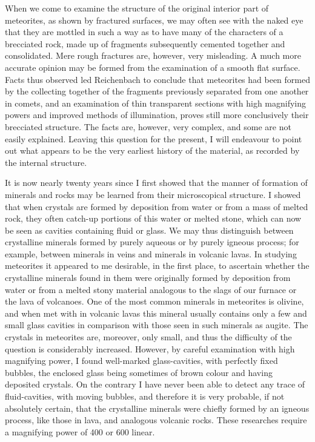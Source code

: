 \documentclass[a4paper, 12pt, oneside]{article}
\begin{document}
When we come to examine the structure of the original interior part of meteorites, as shown by fractured surfaces, we may often see with the naked eye that they are mottled in such a way as to have many of the characters of a brecciated rock, made up of fragments subsequently cemented together and consolidated. Mere rough fractures are, however, very misleading. A much more accurate opinion may be formed from the examination of a smooth flat surface. Facts thus observed led Reichenbach to conclude that meteorites had been formed by the collecting together of the fragments previously separated from one another in comets, and an examination of thin transparent sections with high magnifying powers and improved methods of illumination, proves still more conclusively their brecciated structure. The facts are, however, very complex, and some are not easily explained. Leaving this question for the present, I will endeavour to point out what appears to be the very earliest history of the material, as recorded by the internal structure.

It is now nearly twenty years since I first showed that the manner of formation of minerals and rocks may be learned from their microscopical structure. I showed that when crystals are formed by deposition from water or from a mass of melted rock, they often catch-up portions of this water or melted stone, which can now be seen as cavities containing fluid or glass. We may thus distinguish between crystalline minerals formed by purely aqueous or by purely igneous process; for example, between minerals in veins and minerals in volcanic lavas. In studying meteorites it appeared to me desirable, in the first place, to ascertain whether the crystalline minerals found in them were originally formed by deposition from water or from a melted stony material analogous to the slags of our furnace or the lava of volcanoes. One of the most common minerals in meteorites is olivine, and when met with in volcanic lavas this mineral usually contains only a few and small glass cavities in comparison with those seen in such minerals as augite. The crystals in meteorites are, moreover, only small, and thus the difficulty of the question is considerably increased. However, by careful examination with high magnifying power, I found well-marked glass-cavities, with perfectly fixed bubbles, the enclosed glass being sometimes of brown colour and having deposited crystals. On the contrary I have never been able to detect any trace of fluid-cavities, with moving bubbles, and therefore it is very probable, if not absolutely certain, that the crystalline minerals were chiefly formed by an igneous process, like those in lava, and analogous volcanic rocks. These researches require a magnifying power of 400 or 600 linear.
\end{document}
